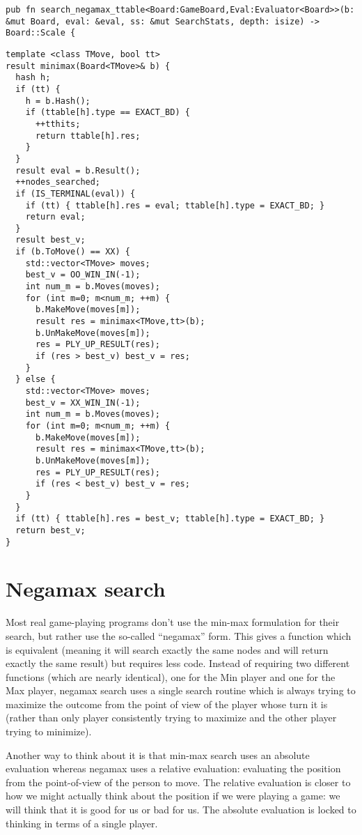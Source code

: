 \documentclass[10pt,dvipdfmx]{report}
\begin{document}
{\scriptsize
\begin{verbatim}
pub fn search_negamax_ttable<Board:GameBoard,Eval:Evaluator<Board>>(b: &mut Board, eval: &eval, ss: &mut SearchStats, depth: isize) -> Board::Scale {
\end{verbatim}
}

\begin{verbatim}
template <class TMove, bool tt>
result minimax(Board<TMove>& b) {
  hash h;
  if (tt) {
    h = b.Hash();
    if (ttable[h].type == EXACT_BD) {
      ++tthits;
      return ttable[h].res;
    }
  }
  result eval = b.Result();
  ++nodes_searched;
  if (IS_TERMINAL(eval)) {
    if (tt) { ttable[h].res = eval; ttable[h].type = EXACT_BD; }
    return eval;
  }
  result best_v;
  if (b.ToMove() == XX) {
    std::vector<TMove> moves;
    best_v = OO_WIN_IN(-1);
    int num_m = b.Moves(moves);
    for (int m=0; m<num_m; ++m) {
      b.MakeMove(moves[m]);
      result res = minimax<TMove,tt>(b);
      b.UnMakeMove(moves[m]);
      res = PLY_UP_RESULT(res);
      if (res > best_v) best_v = res;
    }
  } else {
    std::vector<TMove> moves;
    best_v = XX_WIN_IN(-1);
    int num_m = b.Moves(moves);
    for (int m=0; m<num_m; ++m) {
      b.MakeMove(moves[m]);
      result res = minimax<TMove,tt>(b);
      b.UnMakeMove(moves[m]);
      res = PLY_UP_RESULT(res);
      if (res < best_v) best_v = res;
    }
  }
  if (tt) { ttable[h].res = best_v; ttable[h].type = EXACT_BD; }
  return best_v;
}
\end{verbatim}

\section{Negamax search}


Most real game-playing programs don't use the min-max
formulation for their search, but rather use the so-called
``negamax'' form.  This gives a function which is equivalent
(meaning it will search exactly the same nodes and will
return exactly the same result) but requires less code.
Instead of requiring two different functions (which are nearly identical),
one for the Min player and one for the Max player, negamax search uses
a single search routine which is always trying to maximize the outcome from the
point of view of the player whose turn it is (rather than only player consistently
trying to maximize and the other player trying to minimize).

Another way to think about it is that min-max search uses an absolute
evaluation whereas negamax uses a relative evaluation: evaluating the position
from the point-of-view of the person to move.  The relative evaluation is closer
to how we might actually think about the position if we were playing a game: we
will think that it is good for us or bad for us.  The absolute evaluation is locked
to thinking in terms of a single player.
\end{document}
